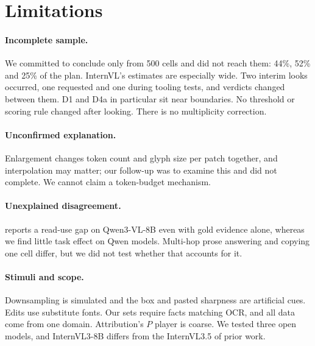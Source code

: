 \documentclass[11pt]{article}
\begin{document}
\begin{table}[t]
\centering\small\setlength{\tabcolsep}{3.5pt}
\resizebox{\columnwidth}{!}{}
\caption{Log-probability vs stated confidence, and refusal under the stronger wording. Gap: P(refuse\,$|$\,wrong)$-$P(refuse\,$|$\,right), points.}
\label{tab:meta}
\end{table}

\section{Limitations}
\label{sec:limits}

\paragraph{Incomplete sample.} We committed to conclude only from 500 cells and did not reach them: 44\%, 52\% and 25\% of the plan. InternVL's estimates are especially wide. Two interim looks occurred, one requested and one during tooling tests, and verdicts changed between them. D1 and D4a in particular sit near boundaries. No threshold or scoring rule changed after looking. There is no multiplicity correction.

\paragraph{Unconfirmed explanation.} Enlargement changes token count and glyph size per patch together, and interpolation may matter; our follow-up was to examine this and did not complete. We cannot claim a token-budget mechanism.

\paragraph{Unexplained disagreement.} \citet{shi2026readaloud} reports a read-use gap on Qwen3-VL-8B even with gold evidence alone, whereas we find little task effect on Qwen models. Multi-hop prose answering and copying one cell differ, but we did not test whether that accounts for it.

\paragraph{Stimuli and scope.} Downsampling is simulated and the box and pasted sharpness are artificial cues. Edits use substitute fonts. Our sets require facts matching OCR, and all data come from one domain. Attribution's $P$ player is coarse. We tested three open models, and InternVL3-8B differs from the InternVL3.5 of prior work.
\end{document}
